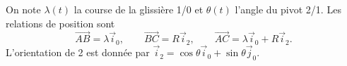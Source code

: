 \begin{corrigebox}
On note $\lambda(t)$ la course de la glissière 1/0 et $\theta(t)$ l'angle du
pivot 2/1. Les relations de position sont
\[\overrightarrow{AB}=\lambda\vec i_0,\qquad
  \overrightarrow{BC}=R\vec i_2,\qquad
  \overrightarrow{AC}=\lambda\vec i_0+R\vec i_2.\]
L'orientation de 2 est donnée par
$\vec i_2=\cos\theta\vec i_0+\sin\theta\vec j_0$.
\end{corrigebox}
